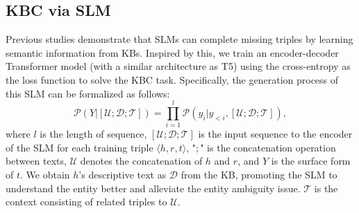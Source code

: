\documentclass[11pt]{article}
\begin{document}
\subsection{KBC via SLM} \label{sec:3.1}
Previous studies \cite{saxena2022kgt5, yao2019kgbertbertknowledgegraph} demonstrate that SLMs can complete missing triples by learning semantic information from KBs. Inspired by this, we train an encoder-decoder Transformer model (with a similar architecture as T5) using the cross-entropy as the loss function to solve the KBC task. Specifically, the generation process of this SLM can be formalized as follows:
\begin{equation}
    \mathcal{P}(Y|[\mathcal{U}; \mathcal{D}; \mathcal{T}])=\prod_{i=1}^{l}{\mathcal{P}(y_i|y_{<i},[\mathcal{U}; \mathcal{D}; \mathcal{T}])},
\end{equation}
where $l$ is the length of sequence, $[\mathcal{U}; \mathcal{D}; \mathcal{T}]$ is the input sequence to the encoder of the SLM for each training triple $\langle h,r,t\rangle$, "$;$" is the concatenation operation between texts, $\mathcal{U}$ denotes the concatenation of $h$ and $r$, and $Y$ is the surface form of $t$. 
We obtain $h$'s descriptive text as \textbf{$\mathcal{D}$} from the KB, promoting the SLM to understand the entity better and alleviate the entity ambiguity issue. \textbf{$\mathcal{T}$} is the context consisting of related triples to $\mathcal{U}$.
\end{document}
